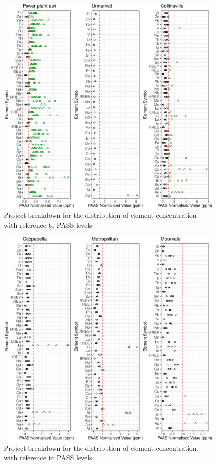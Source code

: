 \documentclass[11pt,a4paper,]{article}
\begin{document}
\newpage

\begin{figure}
\includegraphics[width=1\linewidth,height=1\textheight]{Final_report_files/figure-latex/regionalbk3-1} \caption{Project breakdown for the distribution of element concentration with reference to PASS levels}\label{fig:regionalbk3}
\end{figure}

\newpage

\begin{figure}
\includegraphics[width=1\linewidth,height=1\textheight]{Final_report_files/figure-latex/regionalbk4-1} \caption{Project breakdown for the distribution of element concentration with reference to PASS levels}\label{fig:regionalbk4}
\end{figure}
\end{document}
